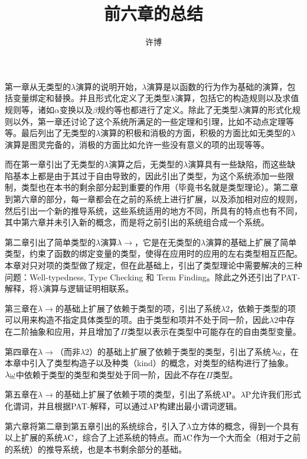 \documentclass[UTF8]{article}
\title{前六章的总结}
\author{许博}
\date{}
\begin{document}
\maketitle
	第一章从无类型的$\lambda$演算的说明开始，$\lambda$演算是以函数的行为作为基础的演算，包括变量绑定和替换。并且形式化定义了无类型$\lambda$演算，包括它的构造规则以及求值规则等，诸如$\alpha$变换以及$\beta$规约等也都进行了定义。除此了无类型$\lambda$演算的形式化规则以外，第一章还讨论了这个系统所满足的一些定理和引理，比如不动点定理等等。最后列出了无类型的$\lambda$演算的积极和消极的方面，积极的方面比如无类型的$\lambda$演算是图灵完备的，消极的方面比如允许一些没有意义的项的出现等等。
	
	而在第一章引出了无类型的$\lambda$演算之后，无类型的$\lambda$演算具有一些缺陷，而这些缺陷基本上都是由于其过于自由导致的，因此引出了类型，为这个系统添加一些限制，类型也在本书的剩余部分起到重要的作用（毕竟书名就是类型理论）。第二章到第六章的部分，每一章都会在之前的系统上进行扩展，以及添加相对应的规则，然后引出一个新的推导系统，这些系统适用的地方不同，所具有的特点也有不同，其中第六章并未引入新的概念，而是将之前引出的系统组合成一个系统。
	
	第二章引出了简单类型的$\lambda$演算$\lambda{\rightarrow}$，它是在无类型的$\lambda$演算的基础上扩展了简单类型，约束了函数的绑定变量的类型，使得在应用时的应用的左右类型相互匹配。本章对只对项的类型做了规定，但在此基础上，引出了类型理论中需要解决的三种问题：Well-typedness, Type Checking 和 Term Finding。除此之外还引出了PAT-解释，将$\lambda$演算与逻辑证明相联系。
	
	第三章在$\lambda{\rightarrow}$的基础上扩展了依赖于类型的项，引出了系统$\lambda{2}$，依赖于类型的项可以用来构造不指定具体类型的项。由于类型和项并不处于同一阶，因此$\lambda{2}$中存在二阶抽象和应用，并且增加了$\Pi$类型以表示在类型中可能存在的自由类型变量。
	
	第四章在$\lambda{\rightarrow}$（而非$\lambda{2}$）的基础上扩展了依赖于类型的类型，引出了系统$\lambda{\uline{\omega}}$，在本章中引入了类型构造子以及种类（kind）的概念，对类型的结构进行了抽象。$\lambda{\uline{\omega}}$中依赖于类型的类型和类型处于同一阶，因此不存在$\Pi$类型。
	
	第五章在$\lambda{\rightarrow}$的基础上扩展了依赖于项的类型，引出了系统$\lambda{\rm P}$。$\lambda{\rm P}$允许我们形式化谓词，并且根据PAT-解释，可以通过$\lambda{\rm P}$构建出最小谓词逻辑。
	
	第六章将第二章到第五章引出的系统综合，引入了$\lambda$立方体的概念，得到一个具有以上扩展的系统$\lambda{\rm C}$，综合了上述系统的特点。而$\lambda{\rm C}$作为一个大而全（相对于之前的系统）的推导系统，也是本书剩余部分的基础。
\end{document}
